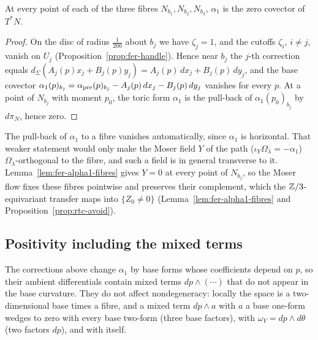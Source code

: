\begin{lemma}\label{lem:fer-alpha1-fibres}
At every point of each of the three fibres $N_{b_1},N_{b_2},N_{b_3}$, $\alpha_1$ is the zero covector of $T^*N$.
\end{lemma}

\begin{proof}
On the disc of radius $\frac1{200}$ about $b_j$ we have $\zeta_j=1$, and the cutoffs $\zeta_i$, $i\ne j$, vanish on $U_j$
(Proposition~\ref{prop:fer-handle}). Hence near $b_j$ the $j$-th correction equals $d_\Sigma(A_j(p)x_j+B_j(p)y_j)=A_j(p)\,dx_j+B_j(p)\,dy_j$,
and the base covector $\alpha_1(p)_{b_j}=\alpha_{\rm pre}(p)_{b_j}-A_j(p)\,dx_j-B_j(p)\,dy_j$ vanishes for every $p$. At a point of
$N_{b_j}$ with moment $p_0$, the toric form $\alpha_1$ is the pull-back of $\alpha_1(p_0)_{b_j}$ by $d\pi_N$, hence zero.
\end{proof}

\begin{remark}\label{rem:fer-covector}
The pull-back of $\alpha_1$ to a fibre vanishes automatically, since $\alpha_1$ is horizontal. That weaker statement would only make
the Moser field $Y$ of the path ($\iota_Y\Omega_\lambda=-\alpha_1$) $\Omega_\lambda$-orthogonal to the fibre, and such a field is in general
transverse to it. Lemma~\ref{lem:fer-alpha1-fibres} gives $Y=0$ at every point of $N_{b_j}$, so the Moser flow fixes these fibres
pointwise and preserves their complement, which the $\mathbb{Z}/3$-equivariant transfer maps into $\{Z_0\ne0\}$
(Lemma~\ref{lem:fer-alpha1-fibres} and Proposition~\ref{prop:rtc-avoid}).
\end{remark}

\subsection{Positivity including the mixed terms}\label{sec:fer-positivity}

The corrections above change $\alpha_1$ by base forms whose coefficients depend on $p$, so their ambient differentials contain
mixed terms $dp\wedge(\cdots)$ that do not appear in the base curvature. They do not affect nondegeneracy: locally the space is a
two-dimensional base times a fibre, and a mixed term $dp\wedge a$ with $a$ a base one-form wedges to zero with every base
two-form (three base factors), with $\omega_V=dp\wedge d\theta$ (two factors $dp$), and with itself.

